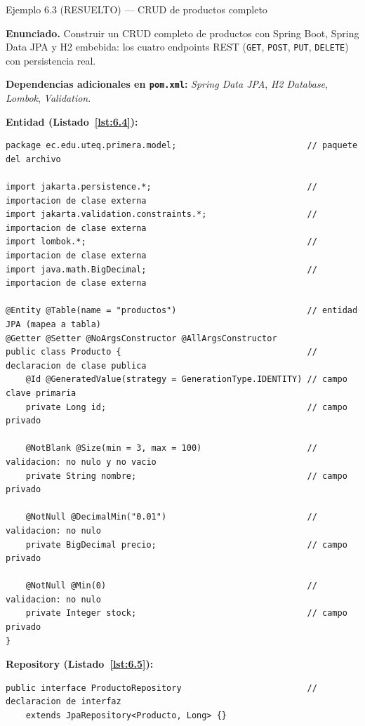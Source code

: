 \documentclass[11pt,a4paper,openany]{book}
\begin{document}
\begin{cajaejemplo}{Ejemplo 6.3 (RESUELTO) --- CRUD de productos completo}


\textbf{Enunciado.} Construir un CRUD completo de productos con Spring Boot, Spring Data JPA y H2 embebida: los cuatro endpoints REST (\texttt{GET}, \texttt{POST}, \texttt{PUT}, \texttt{DELETE}) con persistencia real.

\textbf{Dependencias adicionales en \texttt{pom.xml}:}
\emph{Spring Data JPA}, \emph{H2 Database}, \emph{Lombok},
\emph{Validation}.

\textbf{Entidad (Listado~\ref{lst:6.4}):}
\begin{lstlisting}[style=java,caption={Producto.java},label=lst:6.4]
package ec.edu.uteq.primera.model;                          // paquete del archivo

import jakarta.persistence.*;                               // importacion de clase externa
import jakarta.validation.constraints.*;                    // importacion de clase externa
import lombok.*;                                            // importacion de clase externa
import java.math.BigDecimal;                                // importacion de clase externa

@Entity @Table(name = "productos")                          // entidad JPA (mapea a tabla)
@Getter @Setter @NoArgsConstructor @AllArgsConstructor
public class Producto {                                     // declaracion de clase publica
    @Id @GeneratedValue(strategy = GenerationType.IDENTITY) // campo clave primaria
    private Long id;                                        // campo privado

    @NotBlank @Size(min = 3, max = 100)                     // validacion: no nulo y no vacio
    private String nombre;                                  // campo privado

    @NotNull @DecimalMin("0.01")                            // validacion: no nulo
    private BigDecimal precio;                              // campo privado

    @NotNull @Min(0)                                        // validacion: no nulo
    private Integer stock;                                  // campo privado
}
\end{lstlisting}

\textbf{Repository (Listado~\ref{lst:6.5}):}
\begin{lstlisting}[style=java,numbers=none,caption={Ejemplo de Java},label=lst:6.5]
public interface ProductoRepository                         // declaracion de interfaz
    extends JpaRepository<Producto, Long> {}
\end{lstlisting}


\end{cajaejemplo}
\end{document}
